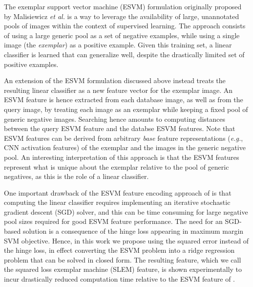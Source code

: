 The exemplar support vector machine (ESVM) formulation originally proposed by Malisiewicz {\it et al.} \cite{Malisiewicza} is a way to leverage the availability of large, unannotated pools of images within the context of supervised learning. The approach consists of using a large generic pool as a set of negative examples, while using a single image (the \emph{exemplar}) as a positive example. Given this training set, a linear classifier is learned that can  generalize well, despite the drastically limited set of positive examples. 

An extension \cite{ZePe15} of the ESVM formulation discussed above instead treats the resulting linear classifier as a new feature vector for the exemplar image. %
An ESVM feature is hence extracted from each database image, as well as from the query image, by treating each image as an exemplar while keeping a fixed pool of generic negative images. Searching hence amounts to computing distances between the query ESVM feature and the databse ESVM features. Note that ESVM features can be derived from arbitrary \emph{base} feature representations ({\it e.g.}, CNN activation features) of the exemplar and the images in the generic negative pool. An interesting interpretation of this approach is that the ESVM features represent what is unique about the exemplar relative to the pool of generic negatives, as this is the role of a linear classifier.

One important drawback of the ESVM feature encoding approach of \cite{ZePe15} is that computing the linear classifier requires implementing an iterative stochastic gradient descent (SGD) solver, and this can be time consuming for large negative pool sizes required for good ESVM feature performance. The need for an SGD-based solution is a consequence of the hinge loss appearing in maximum margin SVM objective. Hence, in this work we  propose using the squared error instead of the hinge loss, in effect converting the ESVM problem into a ridge regression problem that can be solved in closed form. The resulting feature, which we call the squared loss exemplar machine (SLEM) feature, is shown experimentally to incur drastically reduced computation time relative to the ESVM feature of \cite{ZePe15}. 

